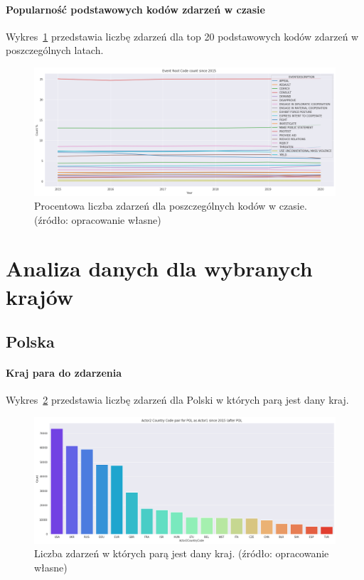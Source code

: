 \documentclass[11pt]{report}
\begin{document}
    \paragraph{Popularność podstawowych kodów zdarzeń w czasie}
    Wykres~\ref{fig:GLOBALERCperc} przedstawia liczbę zdarzeń dla top 20 podstawowych kodów zdarzeń w poszczególnych latach.
    \begin{figure}[!htp]
        \centering
        \includegraphics[width=\linewidth]{fig/GLOBAL/ERCperc.png}
        \caption{Procentowa liczba zdarzeń dla poszczególnych kodów w czasie. (źródło: opracowanie własne)}
        \label{fig:GLOBALERCperc}
    \end{figure}


    \section{Analiza danych dla wybranych krajów}\label{sec:analiza-danych-dla-wybranych-krajów}

    \subsection{Polska}

    \paragraph{Kraj para do zdarzenia}


    Wykres~\ref{fig:PLpair} przedstawia liczbę zdarzeń dla Polski w których parą jest dany kraj.

    \begin{figure}[!htp]
        \centering
        \includegraphics[width=\linewidth]{fig/PL/PLactor2Pair.png}
        \caption{Liczba zdarzeń w których parą jest dany kraj. (źródło: opracowanie własne)}
        \label{fig:PLpair}
    \end{figure}
\end{document}
